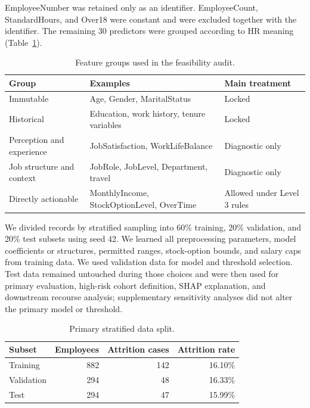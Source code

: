 \documentclass[11pt]{article}
\begin{document}
EmployeeNumber was retained only as an identifier. EmployeeCount, StandardHours, and Over18 were constant and were excluded together with the identifier. The remaining 30 predictors were grouped according to HR meaning (Table~\ref{tab:featuregroups}).

\begin{table}[htbp]
\centering
\caption{Feature groups used in the feasibility audit.}
\label{tab:featuregroups}
\small
\begin{tabularx}{\textwidth}{@{}>{\raggedright\arraybackslash}p{3.0cm}>{\raggedright\arraybackslash}X>{\raggedright\arraybackslash}p{2.9cm}@{}}
\toprule
Group & Examples & Main treatment \\
\midrule
Immutable & Age, Gender, MaritalStatus & Locked \\
Historical & Education, work history, tenure variables & Locked \\
Perception and experience & JobSatisfaction, WorkLifeBalance & Diagnostic only \\
Job structure and context & JobRole, JobLevel, Department, travel & Diagnostic only \\
Directly actionable & MonthlyIncome, StockOptionLevel, OverTime & Allowed under Level 3 rules \\
\bottomrule
\end{tabularx}
\end{table}

\FloatBarrier

We divided records by stratified sampling into 60\% training, 20\% validation, and 20\% test subsets using seed 42. We learned all preprocessing parameters, model coefficients or structures, permitted ranges, stock-option bounds, and salary caps from training data. We used validation data for model and threshold selection. Test data remained untouched during those choices and were then used for primary evaluation, high-risk cohort definition, SHAP explanation, and downstream recourse analysis; supplementary sensitivity analyses did not alter the primary model or threshold.

\begin{table}[htbp]
\centering
\caption{Primary stratified data split.}
\label{tab:splits}
\begin{tabular}{lrrr}
\toprule
Subset & Employees & Attrition cases & Attrition rate \\
\midrule
Training & 882 & 142 & 16.10\% \\
Validation & 294 & 48 & 16.33\% \\
Test & 294 & 47 & 15.99\% \\
\bottomrule
\end{tabular}
\end{table}
\end{document}

